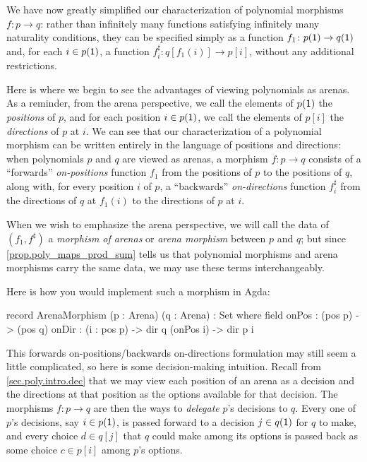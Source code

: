 \documentclass[Book-Poly]{subfiles}
\begin{document}

We have now greatly simplified our characterization of polynomial morphisms $f \colon p \to q$: rather than infinitely many functions satisfying infinitely many naturality conditions, they can be specified simply as a function $f_1 \colon p(\textsf{1}) \to q(\textsf{1})$ and, for each $i \in p(\textsf{1})$, a function $f^\sharp_i \colon q[f_1(i)] \to p[i]$, without any additional restrictions.

Here is where we begin to see the advantages of viewing polynomials as arenas.
As a reminder, from the arena perspective, we call the elements of $p(\textsf{1})$ the \emph{positions} of $p$, and for each position $i \in p(\textsf{1})$, we call the elements of $p[i]$ the \emph{directions} of $p$ at $i$.
We can see that our characterization of a polynomial morphism can be written entirely in the language of positions and directions: when polynomials $p$ and $q$ are viewed as arenas, a morphism $f \colon p \to q$ consists of a ``forwards'' \emph{on-positions} function $f_1$ from the positions of $p$ to the positions of $q$, along with, for every position $i$ of $p$, a ``backwards'' \emph{on-directions} function $f^\sharp_i$ from the directions of $q$ at $f_1(i)$ to the directions of $p$ at $i$.

When we wish to emphasize the arena perspective, we will call the data of $(f_1, f^\sharp)$ a \emph{morphism of arenas} or \emph{arena morphism} between $p$ and $q$; but since \cref{prop.poly_maps_prod_sum} tells us that polynomial morphisms and arena morphisms carry the same data, we may use these terms interchangeably.

Here is how you would implement such a morphism in Agda:
\begin{agda}
record ArenaMorphism (p : Arena) (q : Arena) : Set where
   field
     onPos : (pos p) -> (pos q)
     onDir : (i : pos p) -> dir q (onPos i) -> dir p i
\end{agda}

This forwards on-positions/backwards on-directions formulation may still seem a little complicated, so here is some decision-making intuition.
Recall from \cref{sec.poly.intro.dec} that we may view each position of an arena as a decision and the directions at that position as the options available for that decision.
The morphisms $f\colon p\to q$ are then the ways to \emph{delegate} $p$'s decisions to $q$. Every one of $p$'s decisions, say $i\in p(\textsf{1})$, is passed forward to a decision $j\in q(\textsf{1})$ for $q$ to make, and every choice $d\in q[j]$ that $q$ could make among its options is passed back as some choice $c\in p[i]$ among $p$'s options.
\end{document}
